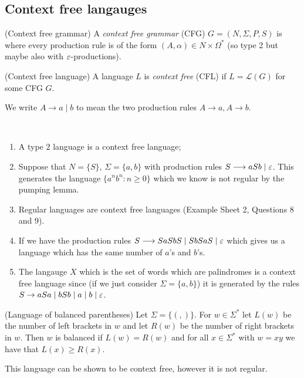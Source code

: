 \documentclass[tikx, border = 10pt]{article}
\begin{document}
\subsection{Context free langauges}
\begin{definition}
	(Context free grammar) A \textit{context free grammar} (CFG) $ G = (N,\Sigma,P,S) $ is where every production rule is of the form $ (A,\alpha)\in N\times \Omega^* $ (so type 2 but maybe also with $ \varepsilon $-productions).
\end{definition}
\begin{definition}
	(Context free language) A language $ L $ is \textit{context free} (CFL) if $ L = \mathcal L(G) $ for some CFG $ G $.
\end{definition}
\begin{remark}
  We write $ A\to a\mid b $ to mean the two production rules $ A\to a , A\to b $.
\end{remark}
\begin{example}
  \ 
  \begin{enumerate}
	  \item A type $ 2 $ language is a context free language;
	  \item Suppose that $ N = \{S\} $, $ \Sigma = \{a,b\} $ with production rules $ S\longrightarrow aSb \mid \varepsilon $. This generates the language $ \{a^nb^n: n\ge 0\} $ which we know is not regular by the pumping lemma.
  \item Regular languages are context free languages (Example Sheet 2, Questions 8 and 9).
  \item If we have the production rules $ S\longrightarrow SaSbS \mid SbSaS \mid \varepsilon $ which gives us a language which has the same number of $ a $'s and $ b $'s.
  \item The langauge $ X $ which is the set of words which are palindromes is a context free language since (if we just consider $ \Sigma = \{a,b\} $) it is generated by the rules $ S\to aSa\mid bSb\mid a\mid b\mid \varepsilon $.
  \end{enumerate}
\end{example}
\begin{definition}
	(Language of balanced parentheses) Let $ \Sigma = \{(,)\} $. For $ w\in \Sigma^* $ let $ L(w) $ be the number of left brackets in $ w $ and let $ R(w) $ be the number of right brackets in $ w $. Then $ w $ is balanced if $ L(w) = R(w) $ and for all $ x\in \Sigma^* $ with $ w=xy $ we have that $ L(x) \ge R(x) $.
\end{definition}
This language can be shown to be context free, however it is not regular.
\end{document}
